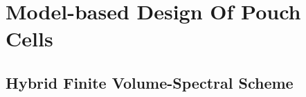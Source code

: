 
\graphicspath{{3/figures/}}

\chapter{Model-based Design Of Pouch Cells}\label{ch:modelbaseddesign}

\section{Hybrid Finite Volume-Spectral Scheme}\label{sec:hybrid fv-spectral}

